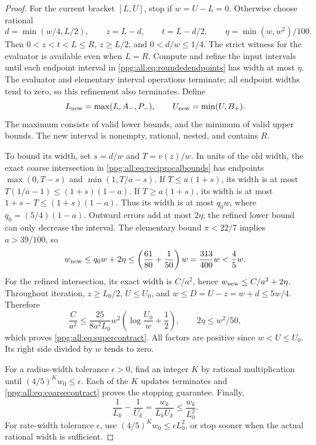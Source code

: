 \documentclass[11pt,letterpaper]{article}
\theoremstyle{remark}\newtheorem{remark}[theorem]{Remark}
\numberwithin{equation}{section}
\begin{document}
\begin{proof}
For the current bracket $[L,U]$, stop if $w=U-L=0$. Otherwise choose rational
\begin{equation}\label{ppg:all:eq:interior}
 d=\min(w/4,L/2),\qquad z=L-d,\qquad t=L-d/2,
 \qquad\eta=\min(w,w^2)/100.
\end{equation}
Then $0<z<t<L\le R$, $z\ge L/2$, and $0<d/w\le1/4$. The strict witness for the evaluator is available even when $L=R$. Compute and refine the input intervals until each endpoint interval in \eqref{ppg:all:eq:roundedendpoints} has width at most $\eta$. The evaluator and elementary interval operations terminate; all endpoint widths tend to zero, so this refinement also terminates. Define
\begin{equation}\label{ppg:all:eq:newLU}
 L_{\rm new}=\max(L,A_-,P_-),\qquad
 U_{\rm new}=\min(U,B_+).
\end{equation}
The maximum consists of valid lower bounds, and the minimum of valid upper bounds. The new interval is nonempty, rational, nested, and contains $R$.

To bound its width, set $s=d/w$ and $T=v(z)/w$. In units of the old width, the exact coarse intersection in \eqref{ppg:all:eq:reciprocalbounds} has endpoints
$\max(0,T-s)$ and $\min(1,T/a-s)$. If $T\le a(1+s)$, its width is at most
$T(1/a-1)\le(1+s)(1-a)$. If $T\ge a(1+s)$, its width is at most
$1+s-T\le(1+s)(1-a)$. Thus its width is at most $q_0w$, where
$q_0=(5/4)(1-a)$. Outward errors add at most $2\eta$; the refined lower bound can only decrease the interval. The elementary bound $\pi<22/7$ implies $a>39/100$, so
\[
 w_{\rm new}\le q_0w+2\eta
 \le\left(\frac{61}{80}+\frac1{50}\right)w
 =\frac{313}{400}w<\frac45w.
\]
For the refined intersection, its exact width is $C/a^2$, hence
$w_{\rm new}\le C/a^2+2\eta$. Throughout iteration,
$z\ge L_0/2$, $U\le U_0$, and $w\le D=U-z=w+d\le5w/4$. Therefore
\[
 \frac C{a^2}\le\frac{25}{8a^2L_0}w^2
       \left(\log\frac{U_0}w+\frac12\right),\qquad
 2\eta\le w^2/50,
\]
which proves \eqref{ppg:all:eq:supercontract}. All factors are positive since $w<U\le U_0$. Its right side divided by $w$ tends to zero.

For a radius-width tolerance $\epsilon>0$, find an integer $K$ by rational multiplication until $(4/5)^Kw_0\le\epsilon$. Each of the $K$ updates terminates and \eqref{ppg:all:eq:coarsecontract} proves the stopping guarantee. Finally,
\[
 \frac1{L_k}-\frac1{U_k}=\frac{w_k}{L_kU_k}\le\frac{w_k}{L_0^2}.
\]
For rate-width tolerance $\epsilon$, use $(4/5)^Kw_0\le\epsilon L_0^2$, or stop sooner when the actual rational width is sufficient.
\end{proof}
\end{document}
